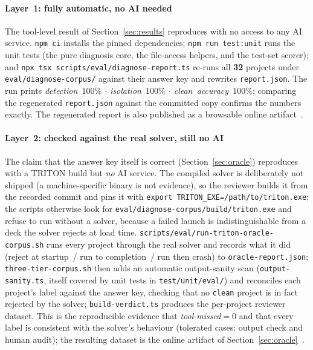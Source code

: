 \documentclass[conference]{IEEEtran}
\begin{document}
\paragraph{Layer~1: fully automatic, no AI needed} The tool-level result of
Section~\ref{sec:results} reproduces with no access to any AI service. \texttt{npm ci} installs the
pinned dependencies; \texttt{npm run test:unit} runs the unit tests (the pure diagnosis core, the
file-access helpers, and the test-set scorer); and \texttt{npx tsx scripts/eval/diagnose-report.ts}
re-runs all \textbf{32} projects under \texttt{eval/diagnose-corpus/} against their answer key and
rewrites \texttt{report.json}. The run prints \emph{detection~$100\%$ $\cdot$ isolation~$100\%$
$\cdot$ clean~accuracy~$100\%$}; comparing the regenerated \texttt{report.json} against the
committed copy confirms the numbers exactly. The regenerated report is also published as a
browsable online artifact~\cite{artifact-tool}.

\paragraph{Layer~2: checked against the real solver, still no AI} The claim that the answer key
itself is correct (Section~\ref{sec:oracle}) reproduces with a TRITON build but \emph{no} AI
service. The compiled solver is deliberately not shipped (a machine-specific binary is not
evidence), so the reviewer builds it from the recorded commit and pins it with
\texttt{export TRITON\_EXE=/path/to/triton.exe}; the scripts otherwise look for
\texttt{eval/diagnose-corpus/build/triton.exe} and refuse to run without a solver, because a
failed launch is indistinguishable from a deck the solver rejects at load time.
\texttt{scripts/eval/run-triton-oracle-corpus.sh} runs every project through the real solver and
records what it did (reject at startup~/ run to completion~/ run then crash) to
\texttt{oracle-report.json}; \texttt{three-tier-corpus.sh} then adds an automatic output-sanity scan
(\texttt{output-sanity.ts}, itself covered by unit tests in \texttt{test/unit/eval/}) and reconciles
each project's label against the answer key, checking that no \texttt{clean} project is in fact
rejected by the solver; \texttt{build-verdict.ts} produces the per-project reviewer dataset. This is
the reproducible evidence that \emph{tool-missed}$=0$ and that every label is consistent with
the solver's behaviour (tolerated cases: output check and human audit);
the resulting dataset is the online artifact of Section~\ref{sec:oracle}~\cite{artifact-oracle}.
\end{document}
